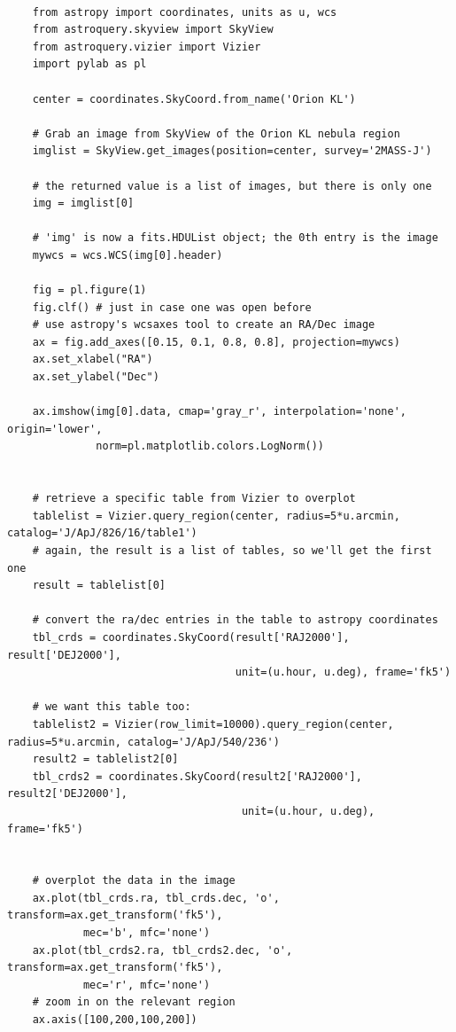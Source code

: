 \documentclass[twocolumn]{aastex61}
\begin{document}
\begin{lstlisting}

    from astropy import coordinates, units as u, wcs
    from astroquery.skyview import SkyView
    from astroquery.vizier import Vizier
    import pylab as pl

    center = coordinates.SkyCoord.from_name('Orion KL')

    # Grab an image from SkyView of the Orion KL nebula region
    imglist = SkyView.get_images(position=center, survey='2MASS-J')

    # the returned value is a list of images, but there is only one
    img = imglist[0]

    # 'img' is now a fits.HDUList object; the 0th entry is the image
    mywcs = wcs.WCS(img[0].header)

    fig = pl.figure(1)
    fig.clf() # just in case one was open before
    # use astropy's wcsaxes tool to create an RA/Dec image
    ax = fig.add_axes([0.15, 0.1, 0.8, 0.8], projection=mywcs)
    ax.set_xlabel("RA")
    ax.set_ylabel("Dec")

    ax.imshow(img[0].data, cmap='gray_r', interpolation='none', origin='lower',
              norm=pl.matplotlib.colors.LogNorm())


    # retrieve a specific table from Vizier to overplot
    tablelist = Vizier.query_region(center, radius=5*u.arcmin, catalog='J/ApJ/826/16/table1')
    # again, the result is a list of tables, so we'll get the first one
    result = tablelist[0]

    # convert the ra/dec entries in the table to astropy coordinates
    tbl_crds = coordinates.SkyCoord(result['RAJ2000'], result['DEJ2000'],
                                    unit=(u.hour, u.deg), frame='fk5')

    # we want this table too:
    tablelist2 = Vizier(row_limit=10000).query_region(center, radius=5*u.arcmin, catalog='J/ApJ/540/236')
    result2 = tablelist2[0]
    tbl_crds2 = coordinates.SkyCoord(result2['RAJ2000'], result2['DEJ2000'],
                                     unit=(u.hour, u.deg), frame='fk5')


    # overplot the data in the image
    ax.plot(tbl_crds.ra, tbl_crds.dec, 'o', transform=ax.get_transform('fk5'),
            mec='b', mfc='none')
    ax.plot(tbl_crds2.ra, tbl_crds2.dec, 'o', transform=ax.get_transform('fk5'),
            mec='r', mfc='none')
    # zoom in on the relevant region
    ax.axis([100,200,100,200])

\end{lstlisting}
\end{document}

